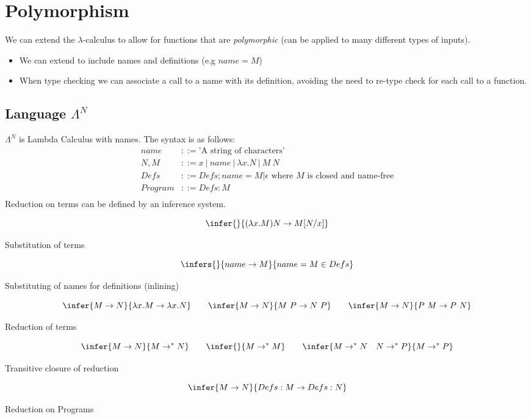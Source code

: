 \chapter{Polymorphism}
We can extend the $\lambda$-calculus to allow for functions that are \textit{polymorphic} (can be applied to many different types of inputs).
\begin{itemize}
	\item We can extend to include names and definitions (e.g $name = M$)
	\item When type checking we can associate a call to a name with its definition, avoiding the need to re-type check for each call to a function.
\end{itemize}

\section{Language $\Lambda^N$}
$\Lambda^N$ is Lambda Calculus with names. The syntax is as follows:
\[\begin{split}
		name & ::= \text{'A string of characters'} \\
		N, M & ::= x \ | \ name \ | \ \lambda x. N \ | \ M \ N \\
		Defs & ::= Defs ; name = M | \epsilon \text{ where } M \text{ is closed and name-free}\\
		Program & ::= Defs : M \\
	\end{split}\]
Reduction on terms can be defined by an inference system.
\\ \begin{minipage}{.48\textwidth}
	\[\infer{}{(\lambda x. M) N \to M[N/x]}\]
	\centerline{Substitution of terms}
\end{minipage}
\hfill
\begin{minipage}{.48\textwidth}
	\[\infers{}{name \to M}{name = M \in Defs}\]
	\centerline{Substituting of names for definitions (inlining)}
\end{minipage}
\vspace{2mm}
\[\infer{M \to N}{\lambda x . M \to \lambda x . N}
	\qquad \infer{M \to N}{M \ P \to N \ P}
	\qquad \infer{M \to N}{P \ M \to P \ N}\]
\centerline{Reduction of terms}

\[\infer{M \to N}{M \to^* N}
	\qquad \infer{}{M \to^* M}
	\qquad \infer{M \to^* N \quad N \to^* P}{M \to^* P}\]
\centerline{Transitive closure of reduction}

\[\infer{M \to N}{Defs : M \to Defs : N}\]
\centerline{Reduction on Programs}

